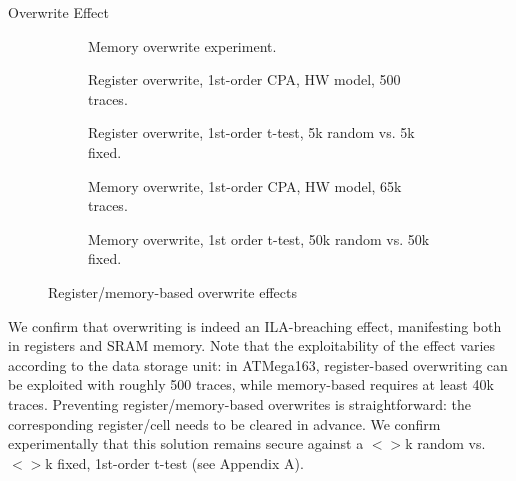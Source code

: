 \begin{subsection}{Overwrite Effect}
\begin{figure}[H]
\begin{subfigure}[b]{0.4\textwidth}
        \caption{\scriptsize{Memory overwrite experiment.}}

    \end{subfigure}

 \begin{subfigure}[b]{0.47\textwidth}

        \caption{\scriptsize{Register overwrite, 1st-order CPA, HW model, 500 traces.}}

    \end{subfigure}
 \begin{subfigure}[b]{0.47\textwidth}

        \caption{\scriptsize{Register overwrite, 1st-order t-test, 5k random vs. 5k fixed.}}

    \end{subfigure}

    \begin{subfigure}[b]{0.47\textwidth}
        \caption{\scriptsize{Memory overwrite, 1st-order CPA, HW model, 65k traces.}}
        \label{fig:tiger}
    \end{subfigure}
    \begin{subfigure}[b]{0.47\textwidth}
        \caption{\scriptsize{Memory overwrite, 1st order t-test, 50k random vs. 50k fixed.}}

    \end{subfigure}
    \caption{Register/memory-based overwrite effects}\label{fig:mem}
\end{figure}
We confirm that overwriting is indeed an ILA-breaching effect, manifesting both in registers and SRAM memory. Note that the exploitability of the effect varies according to the data storage unit: in ATMega163, register-based overwriting can be exploited with roughly 500 traces, while memory-based requires at least 40k traces. Preventing register/memory-based overwrites is straightforward: the corresponding register/cell needs to be cleared in advance. We confirm experimentally that this solution remains secure against a $<>$k random vs. $<>$k fixed, 1st-order t-test (see Appendix A).
\label{overwrite_section}
\end{subsection}

